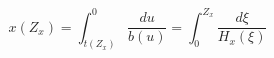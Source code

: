\begin{equation}\label{xred}
 x(Z_x)=\int_{t(Z_x)}^0\frac{du}{b(u)}=\int_0^{Z_x}\frac{d\xi}{H_x(\xi)}
\end{equation}

